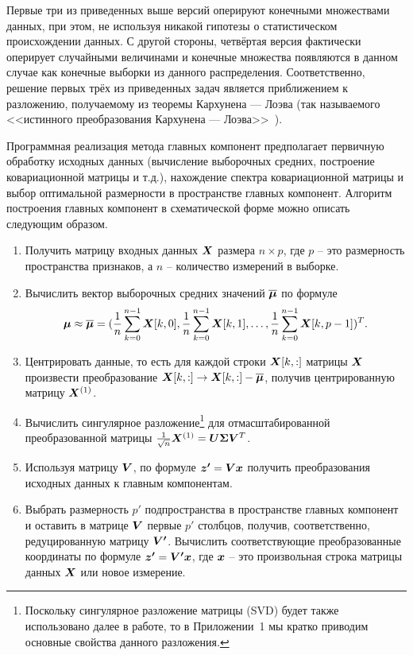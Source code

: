 \documentclass[a4paper,12pt,russian]{article} %
\begin{document}
Первые три из приведенных выше версий оперируют конечными множествами данных, при этом, не используя никакой гипотезы о статистическом происхождении данных.
С другой стороны, четвёртая версия фактически оперирует случайными величинами и конечные множества появляются в данном случае как конечные выборки из данного распределения.
Соответственно, решение первых трёх из приведенных задач является приближением к разложению, получаемому из теоремы Кархунена — Лоэва (так называемого <<истинного преобразования Кархунена — Лоэва>>~\cite{KL_methods_Karhunen1947,KL_methods_Loeve1948}).
	
Программная реализация метода главных компонент предполагает первичную обработку исходных данных (вычисление выборочных средних, построение ковариационной матрицы и т.д.), нахождение спектра ковариационной матрицы и выбор оптимальной размерности в пространстве главных компонент.
Алгоритм построения главных компонент в схематической форме можно описать следующим образом.
\begin{enumerate}
	\item Получить матрицу входных данных $\bm{X}$ размера $n \times p$, где $p$ -- это размерность пространства признаков, а $n$ -- количество измерений в выборке.
	\item Вычислить вектор выборочных средних значений $\bm{\overline \mu}$ по формуле
		$$
			\bm{\mu} \approx \bm{\overline{\mu}} = 
				(
					\frac{1}{n} \sum_{k=0}^{n-1} \bm{X} [k, 0], 
					\frac{1}{n} \sum_{k=0}^{n-1} \bm{X} [k, 1], 
					\ldots,
					\frac{1}{n} \sum_{k=0}^{n-1} \bm{X} [k, p-1]
				)^T.
		$$
	\item Центрировать данные, то есть для каждой строки $\bm{X} [k, :]$ матрицы $\bm{X}$ произвести преобразование
		$\bm{X} [k, :] \rightarrow \bm{X} [k, :] - \bm{\overline \mu}$, получив центрированную матрицу $\bm{X}^{(1)}$.
	\item Вычислить сингулярное разложение\footnote{
		Поскольку сингулярное разложение матрицы (SVD) будет также использовано далее в работе, то в Приложении~1 мы кратко приводим основные свойства данного разложения.
	}
	для отмасштабированной преобразованной матрицы $\frac{1}{\sqrt{n}} \bm{X}^{(1)} = \bm{U} \bm{\Sigma} \bm{V}^T$.
	\item Используя матрицу $\bm{V}$, по формуле $\bm{z'} = \bm{V} \bm{x}$ получить преобразования исходных данных к главным компонентам.
	\item Выбрать размерность $p'$ подпространства в пространстве главных компонент и оставить в матрице $\bm{V}$ первые $p'$ столбцов, получив, соответственно, редуцированную матрицу $\bm{V'}$.
	Вычислить соответствующие преобразованные координаты по формуле $\bm{z'} = \bm{V'} \bm{x}$, где $\bm{x}$ -- это произвольная строка матрицы данных $\bm{X}$ или новое измерение.
\end{enumerate}
\end{document}
